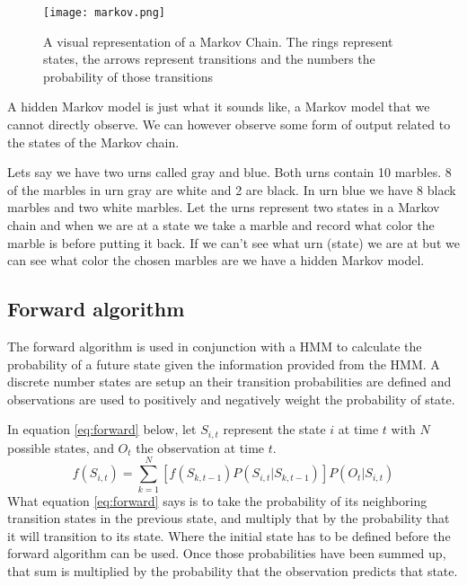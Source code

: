 \documentclass[12pt, a4paper]{article}
\begin{document}
\begin{figure}[!ht]
\centering
\texttt{[image: markov.png]}\\
\caption{A visual representation of a Markov Chain. The rings represent states, the arrows represent transitions and the numbers the probability of those transitions}
\label{mmp_mmd-box}
\end{figure}
\vspace{2.5mm}

A hidden Markov model is just what it sounds like, a Markov model that we cannot directly observe. We can however observe some form of output related to the states of the Markov chain. 

Lets say we have two urns called gray and blue. Both urns contain 10 marbles. 8 of the marbles in urn gray are white and 2 are black. In urn blue we have 8 black marbles and two white marbles. Let the urns represent two states in a Markov chain and when we are at a state we take a marble and record what color the marble is before putting it back. If we can't see what urn (state) we are at but we can see what color the chosen marbles are we have a hidden Markov model.

\subsection{Forward algorithm}

The forward algorithm is used in conjunction with a HMM to calculate the probability of a future state given the information provided from the HMM. A discrete number states are setup an their transition probabilities are defined and observations are used to positively and negatively weight the probability of state.  

In equation \ref{eq:forward} below, let $S_{i,t}$ represent the state $i$ at time $t$ with $N$ possible states, and $O_t$ the observation at time $t$.
\begin{equation}\label{eq:forward}
f(S_{i,t}) = \sum_{k=1}^{N} [f(S_{k,t-1})P(S_{i,t}|S_{k,t-1})]P(O_t|S_{i,t})
\end{equation}
What equation \ref{eq:forward} says is to take the probability of its neighboring transition states in the previous state, and multiply that by the probability that it will transition to its state. Where the initial state has to be defined before the forward algorithm can be used. Once those probabilities have been summed up, that sum is multiplied by the probability that the observation predicts that state.
\end{document}
